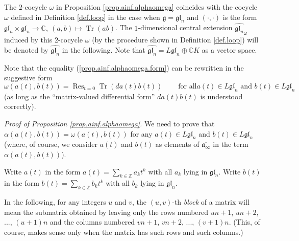 \documentclass[etingof-lie.tex]{subfiles}
\begin{document}
\begin{remark}
The $2$-cocycle $\omega$ in Proposition \ref{prop.ainf.alphaomega} coincides
with the cocycle $\omega$ defined in Definition \ref{def.loop} in the case
when $\mathfrak{g}=\mathfrak{gl}_{n}$ and $\left(  \cdot,\cdot\right)  $ is
the form $\mathfrak{gl}_{n}\times\mathfrak{gl}_{n}\rightarrow\mathbb{C}%
,\ \left(  a,b\right)  \mapsto\operatorname*{Tr}\left(  ab\right)  $. The
$1$-dimensional central extension $\widehat{\mathfrak{gl}_{n}}_{\omega}$
induced by this $2$-cocycle $\omega$ (by the procedure shown in Definition
\ref{def.loop}) will be denoted by $\widehat{\mathfrak{gl}_{n}}$ in the
following. Note that $\widehat{\mathfrak{gl}_{n}}=L\mathfrak{gl}_{n}%
\oplus\mathbb{C}K$ as a vector space.

Note that the equality (\ref{prop.ainf.alphaomega.form}) can be rewritten in
the suggestive form%
\[
\omega\left(  a\left(  t\right)  ,b\left(  t\right)  \right)
=\operatorname*{Res}\nolimits_{t=0}\operatorname*{Tr}\left(  da\left(
t\right)  b\left(  t\right)  \right)  \ \ \ \ \ \ \ \ \ \ \text{for all
}a\left(  t\right)  \in L\mathfrak{gl}_{n}\text{ and }b\left(  t\right)  \in
L\mathfrak{gl}_{n}%
\]
(as long as the ``matrix-valued differential form'' $da\left(  t\right)
b\left(  t\right)  $ is understood correctly).
\end{remark}

\textit{Proof of Proposition \ref{prop.ainf.alphaomega}.} We need to prove
that $\alpha\left(  a\left(  t\right)  ,b\left(  t\right)  \right)
=\omega\left(  a\left(  t\right)  ,b\left(  t\right)  \right)  $ for any
$a\left(  t\right)  \in L\mathfrak{gl}_{n}$ and $b\left(  t\right)  \in
L\mathfrak{gl}_{n}$ (where, of course, we consider $a\left(  t\right)  $ and
$b\left(  t\right)  $ as elements of $\overline{\mathfrak{a}_{\infty}}$ in the
term $\alpha\left(  a\left(  t\right)  ,b\left(  t\right)  \right)  $).

Write $a\left(  t\right)  $ in the form $a\left(  t\right)  =\sum
\limits_{k\in\mathbb{Z}}a_{k}t^{k}$ with all $a_{k}$ lying in $\mathfrak{gl}%
_{n}$. Write $b\left(  t\right)  $ in the form $b\left(  t\right)
=\sum\limits_{k\in\mathbb{Z}}b_{k}t^{k}$ with all $b_{k}$ lying in
$\mathfrak{gl}_{n}$.

In the following, for any integers $u$ and $v$, the $\left(  u,v\right)  $-th
\textit{block} of a matrix will mean the submatrix obtained by leaving only
the rows numbered $un+1$, $un+2$, $...$, $\left(  u+1\right)  n$ and the
columns numbered $vn+1$, $vn+2$, $...$, $\left(  v+1\right)  n$. (This, of
course, makes sense only when the matrix has such rows and such columns.)
\end{document}
